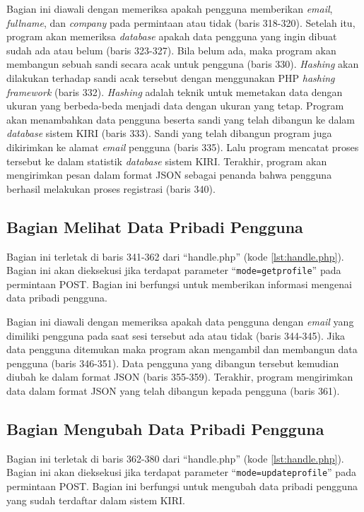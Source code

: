 Bagian ini diawali dengan memeriksa apakah pengguna memberikan \textit{email}, \textit{fullname}, dan \textit{company} pada permintaan atau tidak (baris 318-320). Setelah itu, program akan memeriksa \textit{database} apakah data pengguna yang ingin dibuat sudah ada atau belum (baris 323-327). Bila belum ada, maka program akan membangun sebuah sandi secara acak untuk pengguna (baris 330). \textit{Hashing} akan dilakukan terhadap sandi acak tersebut dengan menggunakan PHP \textit{hashing framework}\cite{openwall} (baris 332). \textit{Hashing} adalah teknik untuk memetakan data dengan ukuran yang berbeda-beda menjadi data dengan ukuran yang tetap\cite{hashing}. Program akan menambahkan data pengguna beserta sandi yang telah dibangun ke dalam \textit{database} sistem KIRI (baris 333). Sandi yang telah dibangun program juga dikirimkan ke alamat \textit{email} pengguna (baris 335). Lalu program mencatat proses tersebut ke dalam statistik \textit{database} sistem KIRI. Terakhir, program akan mengirimkan pesan dalam format JSON sebagai penanda bahwa pengguna berhasil melakukan proses registrasi (baris 340).

\subsection{Bagian Melihat Data Pribadi Pengguna}
\label{sec:lihatdatadiri}
Bagian ini terletak di baris 341-362 dari ``handle.php'' (kode \ref{lst:handle.php}). Bagian ini akan dieksekusi jika terdapat parameter ``\texttt{mode=getprofile}'' pada permintaan POST. Bagian ini berfungsi untuk memberikan informasi mengenai data pribadi pengguna.

Bagian ini diawali dengan memeriksa apakah data pengguna dengan \textit{email} yang dimiliki pengguna pada saat sesi tersebut ada atau tidak (baris 344-345). Jika data pengguna ditemukan maka program akan mengambil dan membangun data pengguna (baris 346-351). Data pengguna yang dibangun tersebut kemudian diubah ke dalam format JSON (baris 355-359). Terakhir, program mengirimkan data dalam format JSON yang telah dibangun kepada pengguna (baris 361).

\subsection{Bagian Mengubah Data Pribadi Pengguna}
\label{sec:ubahdatadiri}
Bagian ini terletak di baris 362-380 dari ``handle.php'' (kode \ref{lst:handle.php}). Bagian ini akan dieksekusi jika terdapat parameter ``\texttt{mode=updateprofile}'' pada permintaan POST. Bagian ini berfungsi untuk mengubah data pribadi pengguna yang sudah terdaftar dalam sistem KIRI.

